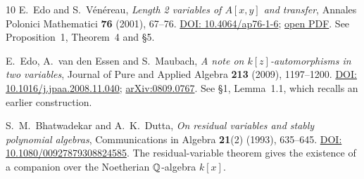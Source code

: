 \begin{thebibliography}{10}
E.~Edo and S.~V\'en\'ereau,
\emph{Length 2 variables of $A[x,y]$ and transfer},
Annales Polonici Mathematici \textbf{76} (2001), 67--76.
\href{https://doi.org/10.4064/ap76-1-6}{DOI: 10.4064/ap76-1-6};
\href{https://www.impan.pl/shop/publication/transaction/download/product/85204}{open PDF}.
See Proposition~1, Theorem~4 and \S5.

E.~Edo, A.~van den Essen and S.~Maubach,
\emph{A note on $k[z]$-automorphisms in two variables},
Journal of Pure and Applied Algebra \textbf{213} (2009), 1197--1200.
\href{https://doi.org/10.1016/j.jpaa.2008.11.040}{DOI: 10.1016/j.jpaa.2008.11.040};
\href{https://arxiv.org/abs/0809.0767}{arXiv:0809.0767}.
See \S1, Lemma~1.1, which recalls an earlier construction.

S.~M.~Bhatwadekar and A.~K.~Dutta,
\emph{On residual variables and stably polynomial algebras},
Communications in Algebra \textbf{21}(2) (1993), 635--645.
\href{https://doi.org/10.1080/00927879308824585}{DOI: 10.1080/00927879308824585}.
The residual-variable theorem gives the existence of a companion over
the Noetherian $\mathbb Q$-algebra $k[x]$.

\end{thebibliography}
